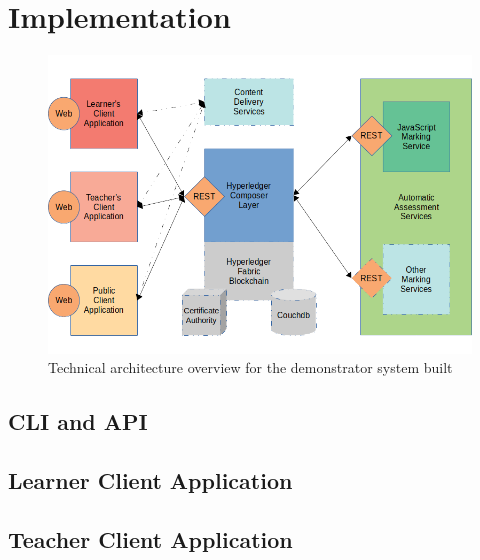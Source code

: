 \chapter{Implementation}

\graphicspath{{Chapter6/Figs/Raster/}{Chapter6/Figs/PDF/}{Chapter6/Figs/}}

\begin{figure}[!ht] 
    \centering    
    \includegraphics[width=1.0\textwidth]{architecture}
    \caption[Technical architecture overview for the demonstrator system built]
        {Technical architecture overview for the demonstrator system built}
    \label{fig:architecture}
\end{figure} 


\section{CLI and API}

\section{Learner Client Application}

\section{Teacher Client Application}